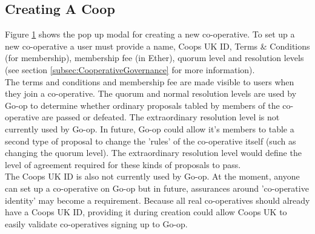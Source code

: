 \subsection{Creating A Coop}

\begin{figure}
\centering
{}
\decoRule
\caption[]{}
\label{fig:createcooppage}
\end{figure}

Figure \ref{fig:createcooppage} shows the pop up modal for creating a new co-operative. To set up a new co-operative a user must provide a name, Coops UK ID, Terms \& Conditions (for membership), membership fee (in Ether), quorum level and resolution levels (see section \ref{subsec:CooperativeGovernance} for more information).\\

The terms and conditions and membership fee are made visible to users when they join a co-operative. The quorum and normal resolution levels are used by Go-op to determine whether ordinary proposals tabled by members of the co-operative are passed or defeated. The extraordinary resolution level is not currently used by Go-op. In future, Go-op could allow it's members to table a second type of proposal to change the 'rules' of the co-operative itself (such as changing the quorum level). The extraordinary resolution level would define the level of agreement required for these kinds of proposals to pass. \\

The Coops UK ID is also not currently used by Go-op. At the moment, anyone can set up a co-operative on Go-op but in future, assurances around 'co-operative identity' may become a requirement. Because all real co-operatives should already have a Coops UK ID, providing it during creation could allow Coops UK to easily validate co-operatives signing up to Go-op.\\
 

